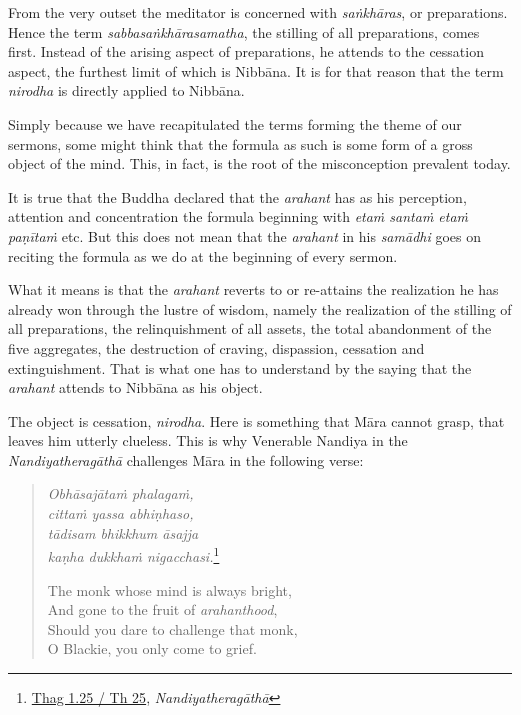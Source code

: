 From the very outset the meditator is concerned with \emph{saṅkhāras}, or preparations. Hence the term \emph{sabbasaṅkhārasamatha}, the stilling of all preparations, comes first. Instead of the arising aspect of preparations, he attends to the cessation aspect, the furthest limit of which is Nibbāna. It is for that reason that the term \emph{nirodha} is directly applied to Nibbāna.

Simply because we have recapitulated the terms forming the theme of our sermons, some might think that the formula as such is some form of a gross object of the mind. This, in fact, is the root of the misconception prevalent today.

It is true that the Buddha declared that the \emph{arahant} has as his perception, attention and concentration the formula beginning with \emph{etaṁ santaṁ etaṁ paṇītaṁ} etc. But this does not mean that the \emph{arahant} in his \emph{samādhi} goes on reciting the formula as we do at the beginning of every sermon.

What it means is that the \emph{arahant} reverts to or re-attains the realization he has already won through the lustre of wisdom, namely the realization of the stilling of all preparations, the relinquishment of all assets, the total abandonment of the five aggregates, the destruction of craving, dispassion, cessation and extinguishment. That is what one has to understand by the saying that the \emph{arahant} attends to Nibbāna as his object.

The object is cessation, \emph{nirodha}. Here is something that Māra cannot grasp, that leaves him utterly clueless. This is why Venerable Nandiya in the \emph{Nandiyatheragāthā} challenges Māra in the following verse:

\begin{quote}
\emph{Obhāsajātaṁ phalagaṁ,}\\
\emph{cittaṁ yassa abhiṇhaso,}\\
\emph{tādisam bhikkhum āsajja}\\
\emph{kaṇha dukkhaṁ nigacchasi.}\footnote{\href{https://suttacentral.net/thag1.25/pli/ms}{Thag 1.25 / Th 25}, \emph{Nandiyatheragāthā}}

\clearpage

The monk whose mind is always bright,\\
And gone to the fruit of \emph{arahanthood},\\
Should you dare to challenge that monk,\\
O Blackie, you only come to grief.
\end{quote}

